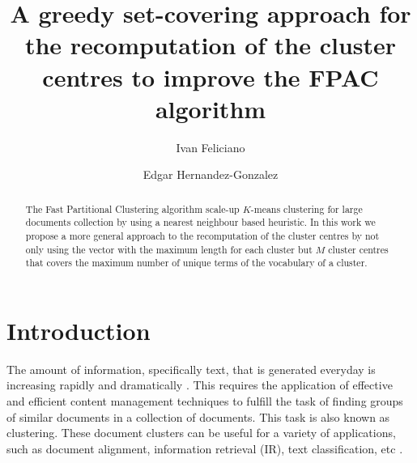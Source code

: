 \documentclass[runningheads]{llncs}
\begin{document}
%
\title{A greedy set-covering approach for the recomputation of the cluster centres to improve the FPAC algorithm}

\author{Ivan Feliciano \and
Edgar Hernandez-Gonzalez}
%
%
\maketitle              %
\begin{abstract}
The Fast Partitional Clustering algorithm \cite{ganguly_2018} scale-up
$K$-means clustering for large documents collection
by using a nearest neighbour based heuristic.
In this work we propose a more general
approach to the recomputation of the cluster centres
by not only using the vector with the maximum length for each cluster
but $M$ cluster centres that covers the maximum number
of unique terms of the vocabulary of a cluster.

\end{abstract}

\section{Introduction}


The amount of information, specifically text, that is generated everyday
is increasing rapidly and dramatically 
\cite{mehdi_assefi_saied_trippe_d._gutierrez_juan_krys_2017}. This requires 
the application of effective and efficient content management techniques to 
fulfill the task of finding groups of similar documents in a collection of documents. This task is also known as 
clustering. These document clusters can be useful for a variety
of applications, such as document alignment, information retrieval
(IR), text classification, etc \cite{ganguly_2018}.

\end{document}
